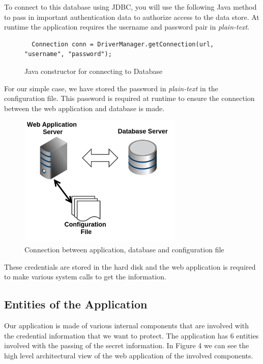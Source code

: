 \documentclass[11pt, a4paper, notitlepage]{article}
\begin{document}
To connect to this database using JDBC, you will use the following Java method to pass in important authentication data to authorize access to the data store. At runtime the application requires the username and password pair in \emph{plain-text}. 


\begin{figure}[h!]
\begin{lstlisting}
  Connection conn = DriverManager.getConnection(url, "username", "password");
\end{lstlisting} 
\caption{Java constructor for connecting to Database}
\end{figure}

For our simple case, we have stored the password in \emph{plain-text} in the configuration file. This password is required at runtime to ensure the connection between the web application and database is made. 

\begin{figure}[h]
    \centering
    \includegraphics[width=0.7\textwidth]{config}
    \caption{Connection between application, database and configuration file}
\end{figure}

These credentials are stored in the hard disk and the web application is required to make various system calls to get the information.

\subsection*{Entities of the Application}
 Our application is made of various internal components that are involved with the credential  information that we want to protect. The application has 6 entities involved with the passing of the secret information. In Figure 4 we can see the high level architectural view of the web application of the involved components. 
\end{document}
